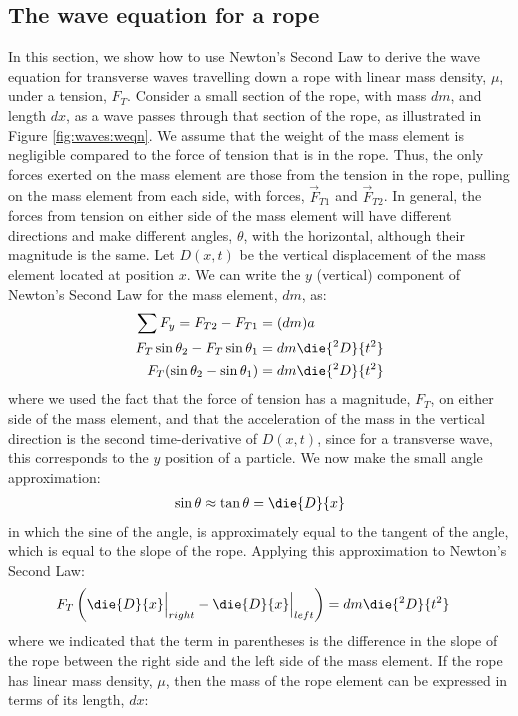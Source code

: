 \subsection{The wave equation for a rope}
In this section, we show how to use Newton's Second Law to derive the wave equation for transverse waves travelling down a rope with linear mass density, $\mu$, under a tension, $F_T$. Consider a small section of the rope, with mass $dm$, and length $dx$, as a wave passes through that section of the rope, as illustrated in Figure \ref{fig:waves:weqn}.
We assume that the weight of the mass element is negligible compared to the force of tension that is in the rope. Thus, the only forces exerted on the mass element are those from the tension in the rope, pulling on the mass element from each side, with forces, $\vec F_{T1}$ and $\vec F_{T2}$. In general, the forces from tension on either side of the mass element will have different directions and make different angles, $\theta$, with the horizontal, although their magnitude is the same. Let $D(x,t)$ be the vertical displacement of the mass element located at position $x$. We can write the $y$ (vertical) component of Newton's Second Law for the mass element, $dm$, as:
\begin{align*}
\sum F_y = F_{T2} - F_{T1} &= (dm)a\\
F_T\sin\theta_2 - F_T\sin\theta_1 &= dm \die{^2D}{t^2}\\
F_T(\sin\theta_2 - \sin\theta_1) &= dm \die{^2D}{t^2}
\end{align*}
where we used the fact that the force of tension has a magnitude, $F_T$, on either side of the mass element, and that the acceleration of the mass in the vertical direction is the second time-derivative of $D(x,t)$, since for a transverse wave, this corresponds to the $y$ position of a particle. We now make the small angle approximation:
\begin{align*}
\sin\theta\approx \tan\theta = \die{D}{x}
\end{align*}
in which the sine of the angle, is approximately equal to the tangent of the angle, which is equal to the slope of the rope. Applying this approximation to Newton's Second Law:
\begin{align*}
F_T\left(\die{D}{x}\Bigr|_{right} - \die{D}{x}\Bigr|_{left}\right) &= dm \die{^2D}{t^2}
\end{align*}
where we indicated that the term in parentheses is the difference in the slope of the rope between the right side and the left side of the mass element. If the rope has linear mass density, $\mu$, then the mass of the rope element can be expressed in terms of its length, $dx$:
